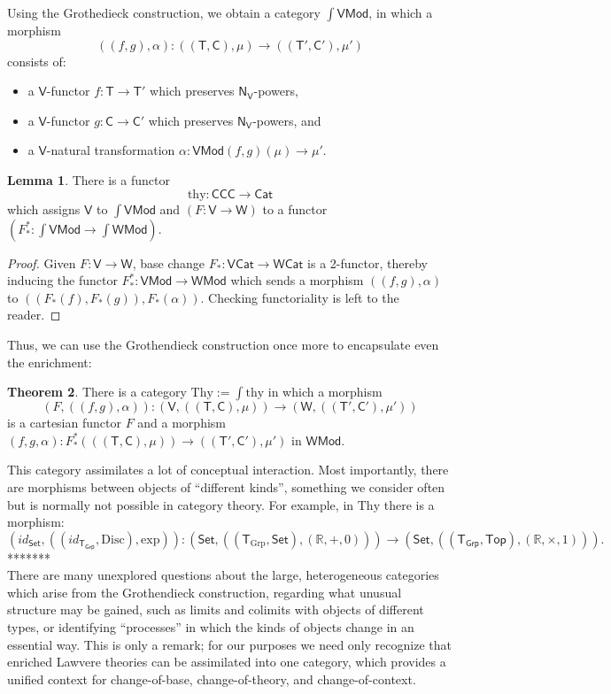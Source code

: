 \documentclass{amsart}
\theoremstyle{definition}
\newtheorem{theorem}{Theorem}
\newtheorem{lemma}[theorem]{Lemma}
\newcommand{\Set}{\mathsf{Set}}
\newcommand{\Grp}{\mathsf{Grp}}
\newcommand{\Cat}{\mathsf{Cat}}
\newcommand{\Top}{\mathsf{Top}}
\newcommand{\CCC}{\mathsf{CCC}}
\newcommand{\Mod}{\mathsf{Mod}}
\newcommand{\NN}{\mathsf{N}}
\newcommand{\V}{\mathsf{V}}
\newcommand{\W}{\mathsf{W}}
\newcommand{\C}{\mathsf{C}}
\newcommand{\T}{\mathsf{T}}
\newcommand{\maps}{\colon}
\begin{document}
Using the Grothedieck construction, we obtain a category \textbf{$\int \V\Mod$}, in which a morphism 
\[   ((f,g),\alpha)\maps ((\T,\C),\mu) \to ((\T',\C'),\mu') \]
consists of:
\begin{itemize}
\item
a $\V$-functor $f\maps\T\to \T'$ which preserves $\NN_\V$-powers,
\item
a $\V$-functor $g\maps\C\to \C'$ which preserves $\NN_\V$-powers, and
\item a $\V$-natural transformation $\alpha\maps\V\Mod(f,g)(\mu)\to \mu'$.
\end{itemize}

\begin{lemma}
	There is a functor $$\mathrm{thy}\maps \CCC \to \Cat$$ which assigns $\V$ to $\int \V\Mod$ and $(F\maps \V \to \W)$ to a functor $(F_*^*\maps \int \V\Mod \to \int \W\Mod)$.
\end{lemma}
\begin{proof}
	Given $F\maps\V\to \W$, base change $F_*\maps \V\Cat \to \W\Cat$ is a 2-functor, thereby inducing the functor $F_*^*\maps\V\Mod\to \W\Mod$ which sends a morphism $((f,g),\alpha)$ to $((F_*(f),F_*(g)),F_*(\alpha))$. Checking functoriality is left to the reader.
\end{proof}

Thus, we can use the Grothendieck construction once more to encapsulate even the enrichment:
\begin{theorem}
	There is a category $\mathrm{Thy} := \int \mathrm{thy}$ in which a morphism $$(F,((f,g),\alpha))\maps (\V,((\T,\C),\mu)) \to (\W,((\T',\C'),\mu'))$$ is a cartesian functor $F$ and a morphism $(f,g,\alpha)\maps F_*^*(((\T,\C),\mu)) \to ((\T',\C'),\mu')$ in $\W\Mod$.
\end{theorem}

This category assimilates a lot of conceptual interaction. Most importantly, there are morphisms between objects of ``different kinds'', something we consider often but is normally not possible in category theory. For example, in $\mathrm{Thy}$ there is a morphism: 
\[ (id_\Set, ((id_{\T_\Grp}, \mathrm{Disc}), \mathrm{exp}))\maps (\Set,((\T_{\mathrm{Grp}},\Set),(\mathbb{R},+,0))) \to (\Set,((\T_\Grp,\Top),(\mathbb{R},\times,1))). \]*******\\

There are many unexplored questions about the large, heterogeneous categories which arise from the Grothendieck construction, regarding what unusual structure may be gained, such as limits and colimits with objects of different types, or identifying ``processes'' in which the kinds of objects change in an essential way. This is only a remark; for our purposes we need only recognize that enriched Lawvere theories can be assimilated into one category, which provides a unified context for change-of-base, change-of-theory, and change-of-context.
\end{document}
